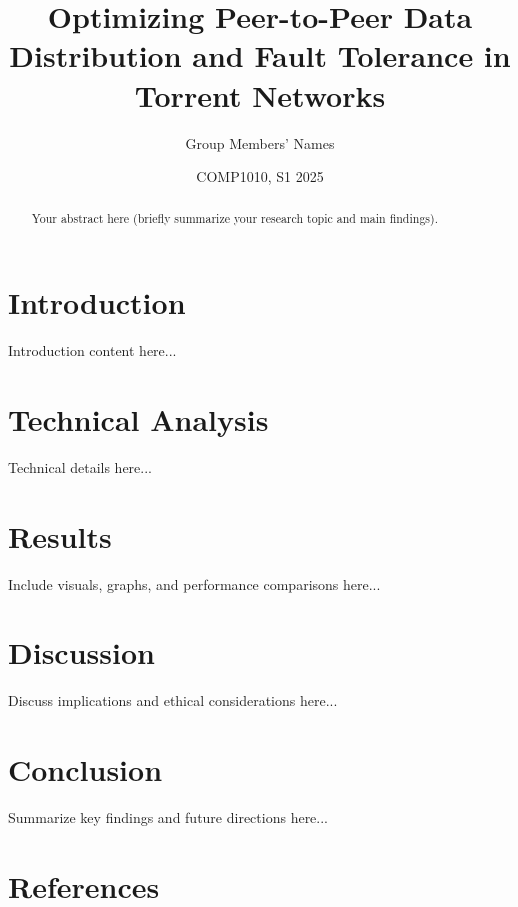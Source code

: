 \documentclass[a0,landscape]{a0poster}
\title{Optimizing Peer-to-Peer Data Distribution and Fault Tolerance in Torrent Networks}
\author{Group Members' Names}
\date{COMP1010, S1 2025}
\begin{document}
\maketitle

\begin{abstract}
Your abstract here (briefly summarize your research topic and main findings).
\end{abstract}

\begin{multicols}{}

\section{Introduction}
Introduction content here...

\section{Technical Analysis}
Technical details here...

\section{Results}
Include visuals, graphs, and performance comparisons here...

\section{Discussion}
Discuss implications and ethical considerations here...

\section{Conclusion}
Summarize key findings and future directions here...

\section*{References}



\end{multicols}
\end{document}

